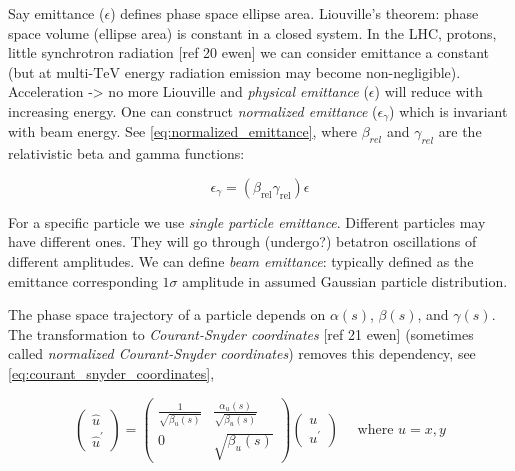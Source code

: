 Say emittance ($\epsilon$) defines phase space ellipse area.
Liouville's theorem: phase space volume (ellipse area) is constant in a closed system.
In the LHC, protons, little synchrotron radiation [ref 20 ewen] we can consider emittance a constant (but at multi-$\mathrm{TeV}$ energy radiation emission may become non-negligible).
Acceleration -> no more Liouville and \emph{physical emittance} ($\epsilon$) will reduce with increasing energy.
One can construct \emph{normalized emittance} ($\epsilon_{\gamma}$) which is invariant with beam energy.
See \cref{eq:normalized_emittance}, where $\beta_{rel}$ and $\gamma_{rel}$ are the relativistic beta and gamma functions:
\bigbreak

\begin{equation}
    \epsilon_{\gamma} = (\beta_{\mathrm{rel}} \gamma_{\mathrm{rel}}) \epsilon
    \label{eq:normalized_emittance}
\end{equation}
\bigbreak

For a specific particle we use \emph{single particle emittance}.
Different particles may have different ones.
They will go through (undergo?) betatron oscillations of different amplitudes.
We can define \emph{beam emittance}: typically defined as the emittance corresponding $1\sigma$ amplitude in assumed Gaussian particle distribution.
\bigbreak

The phase space trajectory of a particle depends on $\alpha(s)$, $\beta(s)$, and $\gamma(s)$.
The transformation to \emph{Courant-Snyder coordinates} [ref 21 ewen] (sometimes called \emph{normalized Courant-Snyder coordinates}) removes this dependency, see \cref{eq:courant_snyder_coordinates},
\bigbreak

\begin{equation}
    \left(\begin{array}{c}
    \hat{u} \\
    \hat{u}^{\prime}
    \end{array}\right) = \left(\begin{array}{cc}
    \frac{1}{\sqrt{\beta_{u}(s)}} & \frac{\alpha_{u}(s)}{\sqrt{\beta_{u}(s)}} \\
    0 & \sqrt{\beta_{u}(s)}
    \end{array}\right)\left(\begin{array}{c}
    u \\
    u^{\prime}
    \end{array}\right) \quad \text{ where } u = x, y
    \label{eq:courant_snyder_coordinates}
\end{equation}

